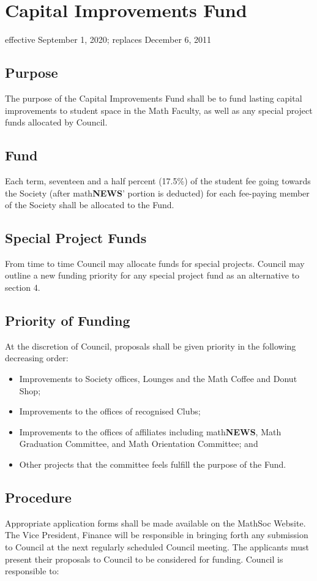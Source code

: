 \section{Capital Improvements Fund}
effective September 1, 2020; replaces December 6, 2011

\subsection{Purpose}
The purpose of the Capital Improvements Fund shall be to fund lasting capital improvements to student space in the Math Faculty, as well as any special project funds allocated by Council.

\subsection{Fund}
Each term, seventeen and a half percent (17.5\%) of the student fee going towards the 
Society (after math\textbf{\textsf{NEWS}}' portion is deducted) for each fee-paying member of the 
Society shall be allocated to the Fund.

\subsection{Special Project Funds}
From time to time Council may allocate funds for special projects. Council may outline a new funding priority for any special project fund as an alternative to section 4.

\subsection{Priority of Funding}
At the discretion of Council, proposals shall be given priority in the following decreasing order:\
\begin{itemize}
\item Improvements to Society offices, Lounges and the Math Coffee and Donut Shop;
\item Improvements to the offices of recognised Clubs;
\item Improvements to the offices of affiliates including math\textbf{\textsf{NEWS}}, Math Graduation Committee, and Math Orientation Committee; and
\item Other projects that the committee feels fulfill the purpose of the Fund.
\end{itemize}

\subsection{Procedure}
Appropriate application forms shall be made available on the MathSoc Website. The Vice
President, Finance will be responsible in bringing forth any submission to Council 
at the next regularly scheduled Council meeting. The applicants must present their 
proposals to Council to be considered for funding. Council is responsible to:

